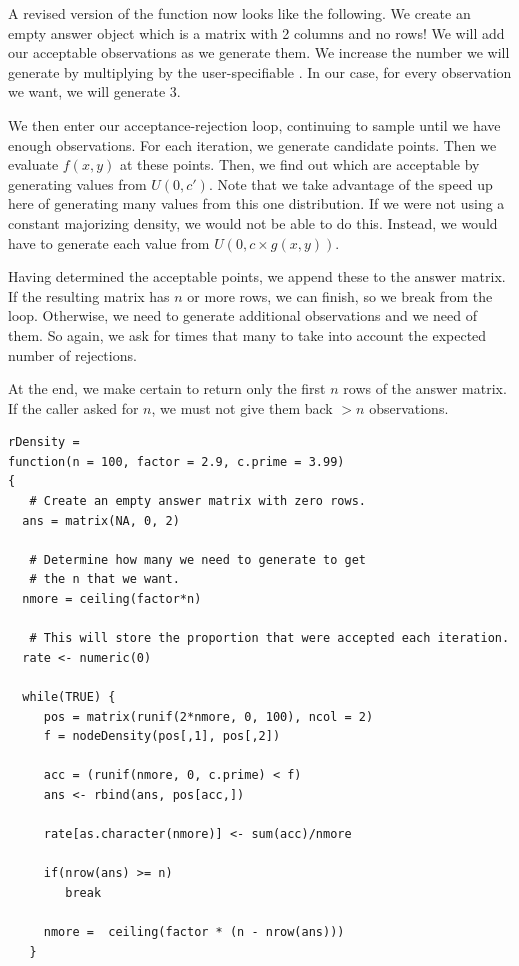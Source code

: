 \documentclass{article}
\begin{document}
\begin{description}
A revised version of the function now looks like the following.
We create an empty answer object which is a matrix with 2 columns
and no rows! We will add our acceptable observations as we generate
them.
We increase the number we will generate by multiplying by
the user-specifiable .
In our case, for every observation we want, we will generate 3.

We then enter our acceptance-rejection loop,
continuing to sample until we have enough
observations.
For each iteration, we generate
 candidate points.
Then we evaluate $f(x, y)$ at these points.
Then, we find out which are acceptable by generating
 values from $U(0, c')$.
Note that we take advantage of the speed up here
of generating many values from this one distribution.
If we were not using a constant majorizing density, we
would not be able to do this. Instead, we would have
to generate each value from $U(0, c \times g(x, y))$.

Having determined the acceptable points, we append these to the answer
matrix. If the resulting matrix has $n$ or more rows, we can finish,
so we break from the loop.  Otherwise, we need to generate additional
observations and we need  of them.  So
again, we ask for  times that many to take into account
the expected number of rejections.

At the end, we make certain to return only the first $n$ rows of the
answer matrix. If the caller asked for $n$, we must not give them back
$> n$ observations.

\begin{verbatim}
rDensity =
function(n = 100, factor = 2.9, c.prime = 3.99)
{
   # Create an empty answer matrix with zero rows.
  ans = matrix(NA, 0, 2)

   # Determine how many we need to generate to get
   # the n that we want. 
  nmore = ceiling(factor*n)

   # This will store the proportion that were accepted each iteration.
  rate <- numeric(0)
  
  while(TRUE) {
     pos = matrix(runif(2*nmore, 0, 100), ncol = 2)
     f = nodeDensity(pos[,1], pos[,2])
     
     acc = (runif(nmore, 0, c.prime) < f)
     ans <- rbind(ans, pos[acc,])

     rate[as.character(nmore)] <- sum(acc)/nmore
     
     if(nrow(ans) >= n)
        break

     nmore =  ceiling(factor * (n - nrow(ans)))
   }


\end{verbatim}
\end{description}
\end{document}
